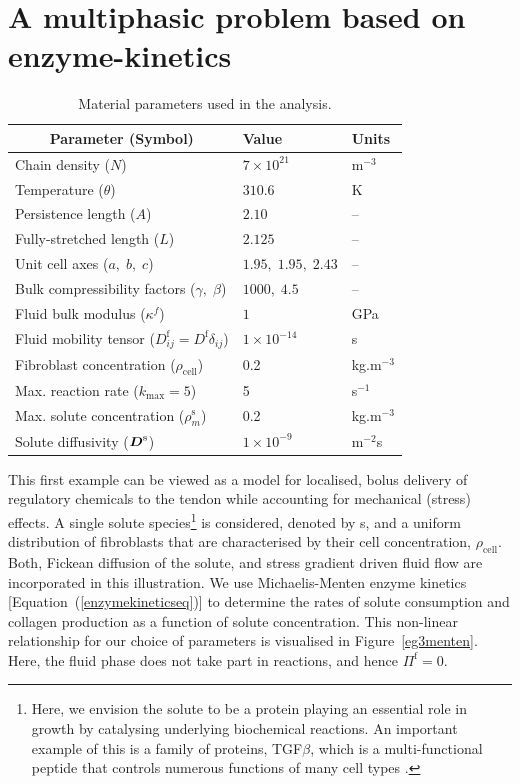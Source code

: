 \section{A multiphasic problem based on enzyme-kinetics}
\label{enzyme-kinetics}

\begin{table}
\centering
\begin{tabular}{lll}
\hline
\multicolumn{1}{c}{Parameter (Symbol)} & Value & Units\\
\hline
Chain density ($N$) & $7\times 10^{21}$ & $\mathrm{m}^{-3}$\\
Temperature ($\theta$)  & $310.6$ & K\\
Persistence length ($A$) & $2.10$ & --\\
Fully-stretched length ($L$) & $2.125$ & --\\
Unit cell axes ($a,\;b,\;c$) & $1.95,\;1.95,\;2.43$ & --\\
Bulk compressibility factors ($\gamma,\;\beta$) & $1000,\; 4.5$ & --\\
Fluid bulk modulus ($\kappa^f$) & $1$ & GPa\\
Fluid mobility tensor ($D^\mathrm{f}_{ij} = D^\mathrm{f}\delta_{ij}$) & $1\times 10^{-14}$
&s\\
Fibroblast concentration ($\rho_{\mathrm{cell}}$) & 0.2 &
kg.m$^{-3}$\\
Max. reaction rate ($k_{\mathrm{max}} = 5$) & 5 & s$^{-1}$\\
Max. solute concentration ($\rho^{\mathrm{s}}_m$) & 0.2 &
kg.m$^{-3}$\\
Solute diffusivity ($\mbox{\boldmath$ D$}^\mathrm{s}$) & $1\times 10^{-9}$ &  m$^{-2}$s\\
\hline
\end{tabular}
\caption{Material parameters used in the analysis.}
\label{parameters}
\end{table}

This first example can be viewed as a model for localised, bolus
delivery of regulatory chemicals to the tendon while accounting for
mechanical (stress) effects. A single solute species\footnote{Here, we
  envision the solute to be a protein playing 
  an essential role in growth by catalysing underlying biochemical
  reactions. An important example of this is a family of proteins,
  TGF$\beta$, which is a multi-functional peptide that controls numerous
  functions of many cell types \citep{Alberts:02}.} is considered,
denoted by s, and 
a uniform distribution of fibroblasts that are characterised by their
cell concentration, $\rho_{\mathrm{cell}}$. Both, Fickean diffusion of
the solute, and stress gradient driven fluid flow are incorporated in this
illustration. We use 
Michaelis-Menten enzyme kinetics [Equation~(\ref{enzymekineticseq})]
to determine the rates of solute consumption and collagen production
as a function of solute concentration. This non-linear relationship for
our choice of parameters is visualised in
Figure~\ref{eg3menten}. Here, the fluid phase does not  take part in
reactions, and hence $\Pi^\mathrm{f}=0$. 

